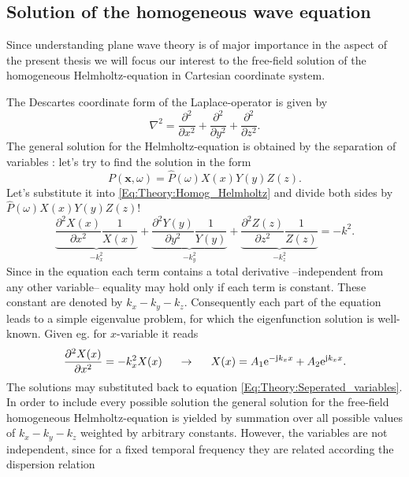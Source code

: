 \subsection{Solution of the homogeneous wave equation}

Since understanding plane wave theory is of major importance in the aspect of the present thesis we will focus our interest to the free-field solution of the homogeneous Helmholtz-equation in Cartesian coordinate system.

The Descartes coordinate form of the Laplace-operator is given by
\begin{equation}
\nabla^2 = \frac{\partial^2}{\partial x^2} + \frac{\partial^2}{\partial y^2} +  \frac{\partial^2}{\partial z^2}.
\end{equation}
The general solution for the Helmholtz-equation is obtained by the separation of variables \cite{Devaney2012}: let's try to find the solution in the form
\begin{equation}
P(\mathbf{x},\omega) = \hat{P}(\omega) X(x)Y(y)Z(z).
\label{Eq:Theory:Seperated_variables}
\end{equation}
Let's substitute it into \eqref{Eq:Theory:Homog_Helmholtz} and divide both sides by $\hat{P}(\omega) X(x)Y(y)Z(z)$!
\begin{equation}
\underbrace{\frac{\partial^2 X(x)}{\partial x^2}\frac{1}{X(x)}}_{-k_x^2} + 
\underbrace{\frac{\partial^2 Y(y)}{\partial y^2}\frac{1}{Y(y)}}_{-k_y^2} + 
\underbrace{\frac{\partial^2 Z(z)}{\partial z^2}\frac{1}{Z(z)}}_{-k_z^2}
= - k^2.
\label{Eq:Theory:Seperated_variables_expanded}
\end{equation}
Since in the equation each term contains a total derivative --independent from any other variable-- equality may hold only if each term is constant. These constant are denoted by $k_x-k_y-k_z$. Consequently each part of the equation leads to a simple eigenvalue problem, for which the eigenfunction solution is well-known. Given eg. for $x$-variable it reads
\begin{equation}
\frac{\partial^2 X(x)}{\partial x^2} = -k_x^2 X(x) \hspace{5mm} \rightarrow \hspace{5mm} X(x) = A_1 \mathrm{e}^{-\mathrm{j} k_x x} + A_2 \mathrm{e}^{\mathrm{j} k_x x}.
\end{equation}
The solutions may substituted back to equation \eqref{Eq:Theory:Seperated_variables}. In order to include every possible solution the general solution for the free-field homogeneous Helmholtz-equation is yielded by summation over all possible values of $k_x-k_y-k_z$ weighted by arbitrary constants. However, the variables are not independent, since for a fixed temporal frequency they are related according the dispersion relation
